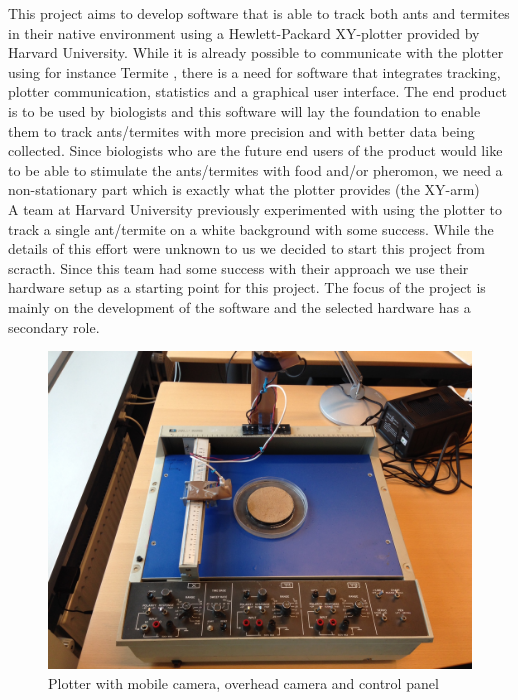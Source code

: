 This project aims to develop software that is able to track both ants and termites in their native environment using a Hewlett-Packard XY-plotter provided by Harvard University. While it is already possible to communicate with the plotter using for instance Termite \cite{termite}, there is a need for software that integrates tracking, plotter communication, statistics and a graphical user interface. The end product is to be used by biologists and this software will lay the foundation to enable them to track ants/termites with more precision and with better data being collected. Since biologists who are the future end users of the product would like to be able to stimulate the ants/termites with food and/or pheromon, we need a non-stationary part which is exactly what the plotter provides (the XY-arm) \\

A team at Harvard University previously experimented with using the plotter to track a single ant/termite on a white background with some success. While the details of this effort were unknown to us we decided to start this project from scracth. Since this team had some success with their approach we use their hardware setup as a starting point for this project. The focus of the project is mainly on the development of the software and the selected hardware has a secondary role. \\



\begin{figure}
        \centering
        \includegraphics[scale=0.125]{img/plotter}
        \caption{Plotter with mobile camera, overhead camera and control panel}
        \label{fig:plotter}
\end{figure}

